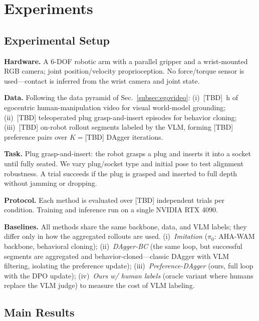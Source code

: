 \documentclass[letterpaper, 10pt, conference]{ieeeconf}
\begin{document}
\section{Experiments}
\label{sec:experiments}

\subsection{Experimental Setup}
\label{subsec:setup}

\textbf{Hardware.} A 6-DOF robotic arm with a parallel gripper and a wrist-mounted RGB camera; joint position/velocity proprioception. No force/torque sensor is used---contact is inferred from the wrist camera and joint state.

\textbf{Data.} Following the data pyramid of Sec.~\ref{subsec:egovideo}: (i)~[TBD]~h of egocentric human-manipulation video for visual world-model grounding; (ii)~[TBD] teleoperated plug grasp-and-insert episodes for behavior cloning; (iii)~[TBD] on-robot rollout segments labeled by the VLM, forming [TBD] preference pairs over $K{=}$[TBD] DAgger iterations.

\textbf{Task.} Plug grasp-and-insert: the robot grasps a plug and inserts it into a socket until fully seated. We vary plug/socket type and initial pose to test alignment robustness. A trial succeeds if the plug is grasped and inserted to full depth without jamming or dropping.

\textbf{Protocol.} Each method is evaluated over [TBD] independent trials per condition. Training and inference run on a single NVIDIA RTX 4090.

\textbf{Baselines.} All methods share the same backbone, data, and VLM labels; they differ only in how the aggregated rollouts are used. (i)~\emph{Imitation} ($\pi_0$: AHA-WAM backbone, behavioral cloning); (ii)~\emph{DAgger-BC} (the same loop, but successful segments are aggregated and behavior-cloned---classic DAgger with VLM filtering, isolating the preference update); (iii)~\emph{Preference-DAgger} (ours, full loop with the DPO update); (iv)~\emph{Ours w/ human labels} (oracle variant where humans replace the VLM judge) to measure the cost of VLM labeling.

\subsection{Main Results}
\label{subsec:main_results}
\end{document}
